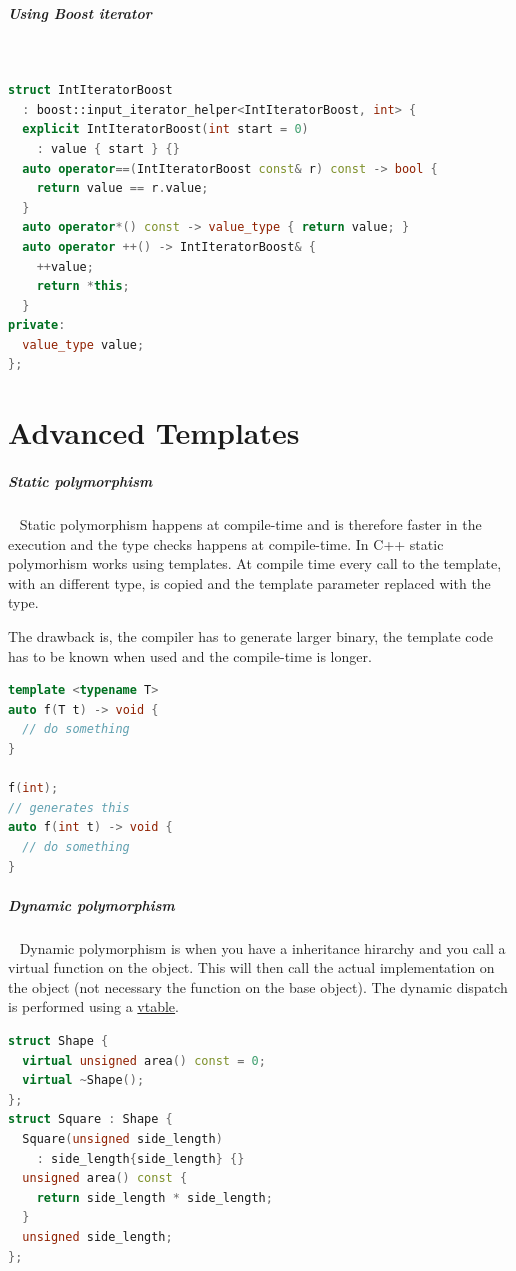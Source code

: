 \documentclass[11pt,twoside,landscape]{article}
\begin{document}
\begin{multicols}{2}
\subparagraph{Using Boost iterator} \
\label{sec:org358d51d}
\begin{lstlisting}[language=c++,numbers=none]
struct IntIteratorBoost
  : boost::input_iterator_helper<IntIteratorBoost, int> {
  explicit IntIteratorBoost(int start = 0)
    : value { start } {}
  auto operator==(IntIteratorBoost const& r) const -> bool {
    return value == r.value;
  }
  auto operator*() const -> value_type { return value; }
  auto operator ++() -> IntIteratorBoost& {
    ++value;
    return *this;
  }
private:
  value_type value;
};
\end{lstlisting}
\section{Advanced Templates}
\label{sec:org2621b01}
\subparagraph{Static polymorphism} \
\label{sec:org390601d}
Static polymorphism happens at compile-time and is therefore faster in the execution and the type checks happens at compile-time.
In C++ static polymorhism works using templates.
At compile time every call to the template, with an different type, is copied and the template parameter replaced with the type.

The drawback is, the compiler has to generate larger binary, the template code has to be known when used and the compile-time is longer.

\begin{lstlisting}[language=c++,label=lst:example-for-a-cpp-template,caption={Example for a C++ template},captionpos=b,numbers=none]
template <typename T>
auto f(T t) -> void {
  // do something
}

f(int);
// generates this
auto f(int t) -> void {
  // do something
}
\end{lstlisting}

\subparagraph{Dynamic polymorphism} \
\label{sec:org2f3b70d}
Dynamic polymorphism is when you have a inheritance hirarchy and you call a virtual function on the object.
This will then call the actual implementation on the object (not necessary the function on the base object).
The dynamic dispatch is performed using a \href{../../../roam/20221230181314-what_is_the_virtual_method_table.org}{vtable}.

\begin{lstlisting}[language=c++,numbers=none]
struct Shape {
  virtual unsigned area() const = 0;
  virtual ~Shape();
};
struct Square : Shape {
  Square(unsigned side_length)
    : side_length{side_length} {}
  unsigned area() const {
    return side_length * side_length;
  }
  unsigned side_length;
};


\end{lstlisting}
\end{multicols}
\end{document}
